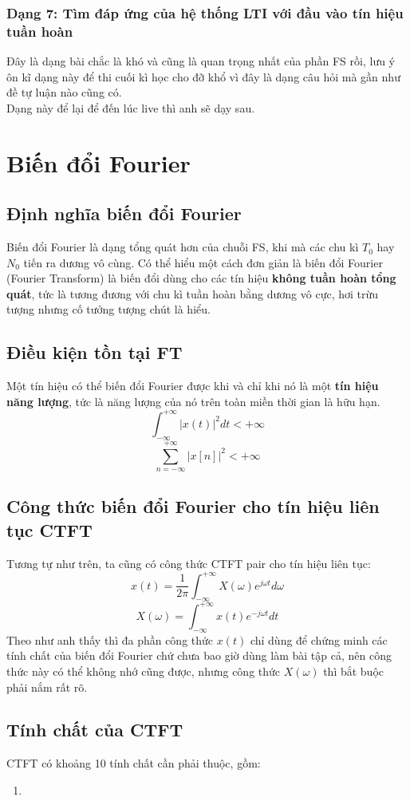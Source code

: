 \documentclass{article}
\begin{document}
\subsubsection{Dạng 7: Tìm đáp ứng của hệ thống LTI với đầu vào tín hiệu tuần hoàn}
Đây là dạng bài chắc là khó và cũng là quan trọng nhất của phần FS rồi, lưu ý ôn kĩ dạng này để thi cuối kì học cho đỡ khổ vì đây là dạng câu hỏi mà gần như đề tự luận nào cũng có.
\\ Dạng này để lại để đến lúc live thì anh sẽ dạy sau.
\section{Biến đổi Fourier}
\subsection{Định nghĩa biến đổi Fourier}
Biến đổi Fourier là dạng tổng quát hơn của chuỗi FS, khi mà các chu kì $T_{0}$ hay $N_{0}$ tiến ra dương vô cùng. Có thể hiểu một cách đơn giản là biến đổi Fourier (Fourier Transform) là biến đổi dùng cho
các tín hiệu \textbf{không tuần hoàn tổng quát}, tức là tương đương với chu kì tuần hoàn bằng dương vô cực, hơi trừu tượng nhưng cố tưởng tượng chút là hiểu.
\subsection{Điều kiện tồn tại FT}
Một tín hiệu có thể biến đổi Fourier được khi và chỉ khi nó là một \textbf{tín hiệu năng lượng}, tức là năng lượng của nó trên toàn miền thời gian là hữu hạn.
$$\int_{-\infty}^{+\infty}|x(t)|^2dt < + \infty$$
$$\sum_{n=-\infty}^{+\infty}|x[n]|^2 < + \infty$$
\subsection{Công thức biến đổi Fourier cho tín hiệu liên tục CTFT}
Tương tự như trên, ta cũng có công thức CTFT pair cho tín hiệu liên tục:
$$x(t)=\frac{1}{2\pi}\int_{-\infty}^{+\infty}X(\omega)e^{j\omega t}d\omega$$
$$X(\omega)=\int_{-\infty}^{+\infty}x(t)e^{-j\omega t}dt$$
Theo như anh thấy thì đa phần công thức $x(t)$ chỉ dùng để chứng minh các tính chất của biến đổi Fourier chứ chưa bao giờ dùng làm bài tập cả, nên công thức này có thể không nhớ cũng được, nhưng công thức $X(\omega)$ thì bắt buộc phải nắm rất rõ.
\subsection{Tính chất của CTFT}
CTFT có khoảng 10 tính chất cần phải thuộc, gồm:
\begin{enumerate}
    \item 
\end{enumerate}
\end{document}
